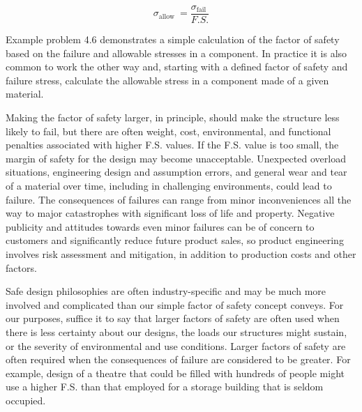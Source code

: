 \documentclass[
  letterpaper,
  DIV=11,
  numbers=noendperiod]{scrreprt}
\begin{document}
\[
\sigma_{\text {allow }}=\frac{\sigma_{\text {fail }}}{F . S .}
\]

Example problem 4.6 demonstrates a simple calculation of the factor of
safety based on the failure and allowable stresses in a component. In
practice it is also common to work the other way and, starting with a
defined factor of safety and failure stress, calculate the allowable
stress in a component made of a given material.

Making the factor of safety larger, in principle, should make the
structure less likely to fail, but there are often weight, cost,
environmental, and functional penalties associated with higher F.S.
values. If the F.S. value is too small, the margin of safety for the
design may become unacceptable. Unexpected overload situations,
engineering design and assumption errors, and general wear and tear of a
material over time, including in challenging environments, could lead to
failure. The consequences of failures can range from minor
inconveniences all the way to major catastrophes with significant loss
of life and property. Negative publicity and attitudes towards even
minor failures can be of concern to customers and significantly reduce
future product sales, so product engineering involves risk assessment
and mitigation, in addition to production costs and other factors.

Safe design philosophies are often industry-specific and may be much
more involved and complicated than our simple factor of safety concept
conveys. For our purposes, suffice it to say that larger factors of
safety are often used when there is less certainty about our designs,
the loads our structures might sustain, or the severity of environmental
and use conditions. Larger factors of safety are often required when the
consequences of failure are considered to be greater. For example,
design of a theatre that could be filled with hundreds of people might
use a higher F.S. than that employed for a storage building that is
seldom occupied.
\end{document}

